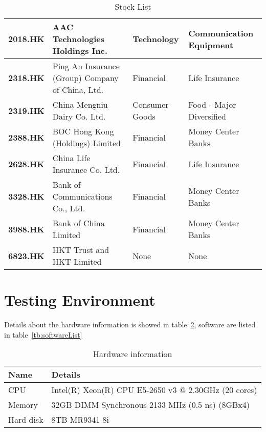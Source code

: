 \begin{table}[h]
{\begin{tabular}{|l|l|l|l|}
			\textbf{2018.HK} & AAC Technologies Holdings Inc.                   & Technology       & Communication Equipment                   \\ \hline
			\textbf{2318.HK} & Ping An Insurance (Group) Company of China, Ltd. & Financial        & Life Insurance                            \\ \hline
			\textbf{2319.HK} & China Mengniu Dairy Co. Ltd.                     & Consumer Goods   & Food - Major Diversified                  \\ \hline
			\textbf{2388.HK} & BOC Hong Kong (Holdings) Limited                 & Financial        & Money Center Banks                        \\ \hline
			\textbf{2628.HK} & China Life Insurance Co. Ltd.                    & Financial        & Life Insurance                            \\ \hline
			\textbf{3328.HK} & Bank of Communications Co., Ltd.                 & Financial        & Money Center Banks                        \\ \hline
			\textbf{3988.HK} & Bank of China Limited                            & Financial        & Money Center Banks                        \\ \hline
			\textbf{6823.HK} & HKT Trust and HKT Limited                        & None             & None                                      \\ \hline
		\end{tabular}%
	}
	\caption{Stock List}
	\label{tb:stockList}
\end{table}

\section{Testing Environment}
\label{sec:environment}
Details about the hardware information is showed in table~\ref{tb:hardwareConf}, software are listed in table~\ref{tb:softwareList}
\begin{table}[h]
	\centering
	\begin{tabular}{|l|l|}
		\hline
		\textbf{Name} & \textbf{Details} \\ \hline
		CPU & Intel(R) Xeon(R) CPU E5-2650 v3 @ 2.30GHz (20 cores) \\ \hline
		Memory & 32GB DIMM Synchronous 2133 MHz (0.5 ns) (8GBx4) \\ \hline
		Hard disk & 8TB MR9341-8i \\ \hline
	\end{tabular}
	\caption{Hardware information}
	\label{tb:hardwareConf}
\end{table}

